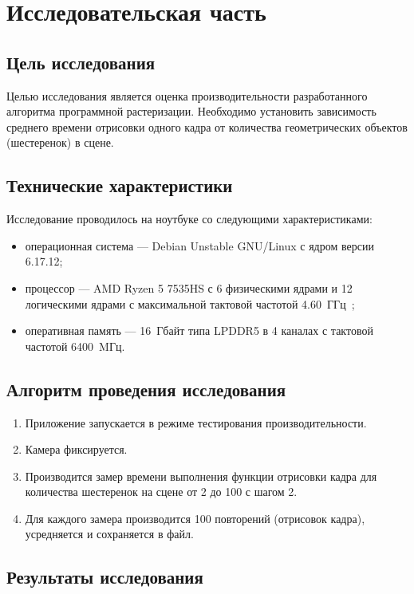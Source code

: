 \section{Исследовательская часть}

\subsection{Цель исследования}

Целью исследования является оценка производительности разработанного алгоритма программной растеризации. Необходимо установить зависимость среднего времени отрисовки одного кадра от количества геометрических объектов (шестеренок) в сцене.

\subsection{Технические характеристики}

Исследование проводилось на ноутбуке со следующими характеристиками:
\begin{itemize}
	\item операционная система --- Debian Unstable GNU/Linux с ядром версии 6.17.12;
	\item процессор --- AMD Ryzen 5 7535HS с 6 физическими ядрами и 12 логическими ядрами с максимальной тактовой частотой 4.60~ГГц~\cite{ryzen};
	\item оперативная память --- 16~Гбайт типа LPDDR5 в 4 каналах с тактовой частотой 6400~MГц.
\end{itemize}

\subsection{Алгоритм проведения исследования}

\begin{enumerate}
	\item Приложение запускается в режиме тестирования производительности.
	\item Камера фиксируется.
	\item Производится замер времени выполнения функции отрисовки кадра для количества шестеренок на сцене от 2 до 100 с шагом 2.
	\item Для каждого замера производится 100 повторений (отрисовок кадра), усредняется и сохраняется в файл.
\end{enumerate}

\subsection{Результаты исследования}

